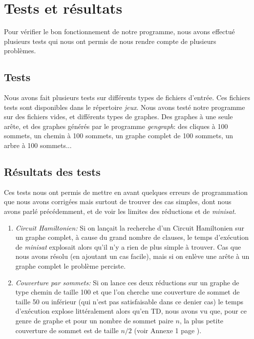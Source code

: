  \section{Tests et résultats}
  Pour vérifier le bon fonctionnement de notre programme, nous avons
  effectué plusieurs tests qui nous ont permis de nous rendre compte de
  plusieurs problèmes.

  \subsection{Tests}
  Nous avons fait plusieurs tests sur différents types de fichiers
  d'entrée. Ces fichiers tests sont disponibles dans le répertoire
  \emph{jeux}. \newline
  \indent Nous avons testé notre programme sur des fichiers vides,
  et différents types de graphes. Des graphes à une seule arête, et des
  graphes générés par le programme \emph{gengraph}: des cliques à 100
  sommets, un chemin à 100 sommets, un graphe complet de 100 sommets, un
  arbre à 100 sommets...

  \subsection{Résultats des tests}
  Ces tests nous ont permis de mettre en avant quelques erreurs de
  programmation que nous avons corrigées mais surtout de trouver des cas
  simples, dont nous avons parlé précédemment, et de voir les limites
  des réductions et de \emph{minisat}.
  \begin{enumerate}
   \item \emph{Circuit Hamiltonien:} Si on lançait la recherche d'un
	 Circuit Hamiltonien sur un graphe complet, à cause du grand
	 nombre de clauses, le temps d'exécution de \emph{minisat}
	 explosait alors qu'il n'y a rien de plus simple à trouver. Cas
	 que nous avons résolu (en ajoutant un cas facile), mais si on
	 enlève une arête à un graphe complet le problème perciste.
   \item \emph{Couverture par sommets:} Si on lance ces deux
	 réductions sur un graphe de type chemin de taille 100 et que
	 l'on cherche une couverture de sommet de taille 50 ou
	 inférieur (qui n'est pas satisfaisable dans ce denier cas) le
	 temps d'exécution explose littéralement alors qu'en TD, nous
	 avons vu que, pour ce genre de graphe et pour un nombre de
	 sommet paire $n$, la plus petite couverture de sommet est de
	 taille $n/2$ (voir Annexe 1 page \pageref{an1}). 
  \end{enumerate}


